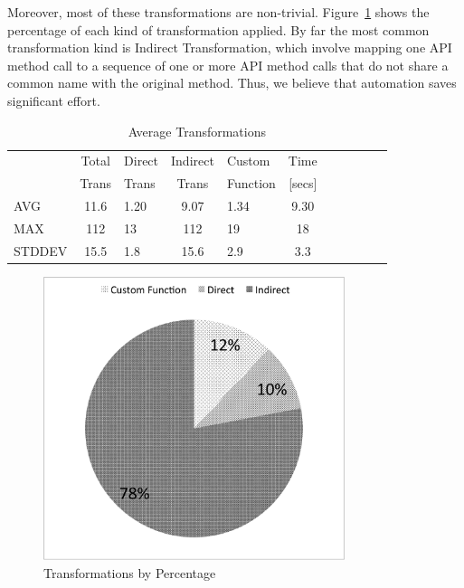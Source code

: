 \documentclass{sigplanconf}
\begin{document}

Moreover, most of these transformations are non-trivial. Figure~\ref{fig:transformations_pieChart} shows the percentage of each kind of transformation applied. By far the most common transformation kind is Indirect Transformation, which involve mapping one API method call to a sequence of one or more API method calls that do not share a common name with the original method. Thus, we believe that automation saves significant effort.


\begin{table}[htdp]
\begin{center}
\begin{tabular}{lclclclclcl}
 & Total & Direct & Indirect & Custom & Time \\
  & Trans & Trans & Trans & Function & [secs] \\
  \hline
  \hline
AVG & 11.6 & 1.20 & 9.07 & 1.34 & 9.30 \\
\hline
MAX & 112 & 13 & 112 & 19 & 18 \\
\hline
STDDEV & 15.5 & 1.8 & 15.6 & 2.9 & 3.3 \\
\end{tabular}
\nocaptionrule
\caption{Average Transformations}
\label{table:avgTrans}
\end{center}
\end{table}%

\begin{figure}[htbp!]
\begin{center}
\includegraphics[width=250pt]{images/TransformationsChart}
\nocaptionrule
\caption{Transformations by Percentage}
\label{fig:transformations_pieChart}
\end{center}
\end{figure}
\end{document}
